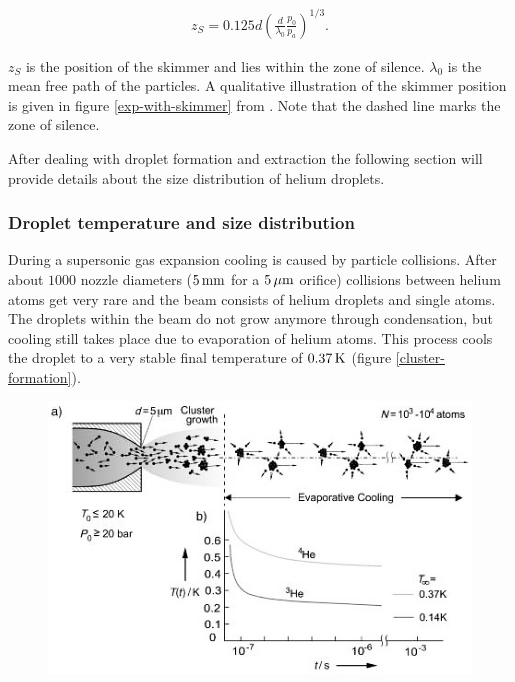 \documentclass[parskip,12pt,headsepline,a4paper] {scrbook}
\begin{document}
\begin{align}  \label{skimmer-position}
z_S = 0.125d\left(\frac{d}{\lambda_0}\frac{p_0}{p_a}\right)^{1/3}.
\end{align}

$z_S$ is the position of the skimmer and lies within the zone of silence. $\lambda_0$ is the mean free path of the particles. A qualitative illustration of the skimmer position is given in figure \ref{exp-with-skimmer} from \cite{skimmer-pos}. Note that the dashed line marks the zone of silence.

After dealing with droplet formation and extraction the following section will provide details about the size distribution of helium droplets.


\subsubsection{Droplet temperature and size distribution}
\vspace{-1\baselineskip}
During a supersonic gas expansion cooling is caused by particle collisions. After about $1000$ nozzle diameters ($\unit[5]{mm}$ for a $\unit[5]{\mu m}$ orifice) collisions between helium atoms get very rare and the beam consists of helium droplets and single atoms. The droplets within the beam do not grow anymore through condensation, but cooling still takes place due to evaporation of helium atoms. This process cools the droplet to a very stable final temperature of $\unit[0.37]{K}$ (figure \ref{cluster-formation}).
\begin{figure}[ht]
\centerline{
\includegraphics[width=12cm]{./expansion/cluster-formation_sharp.jpg}}
\end{figure}\\
\end{document}
